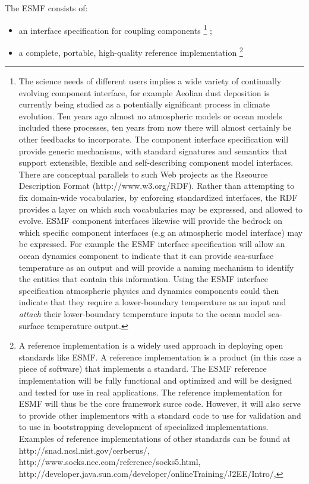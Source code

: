 \noindent The ESMF consists of:
\begin{itemize}
\item an interface specification for coupling components \footnote{
The science needs of different users
implies a wide variety of continually evolving component interface, for
example Aeolian dust deposition is currently being studied as a
potentially significant process in climate evolution. Ten years ago
almost no atmospheric models or ocean models included these processes,
ten years from now there will almost certainly be other feedbacks to
incorporate. The component interface specification will provide generic
mechanisms, with standard signatures and semantics that support
extensible, flexible and self-describing component model interfaces.
There are conceptual parallels to such Web projects as the
Rseource Description Format (http://www.w3.org/RDF). Rather than
attempting to fix domain-wide vocabularies, by enforcing standardized
interfaces, the RDF provides a layer on which
such vocabularies may be expressed, and allowed to evolve. ESMF
component interfaces likewise will provide the bedrock on which specific
component interfaces (e.g an atmospheric model interface) may be expressed.
For example the ESMF interface specification will allow an ocean dynamics component
to indicate that it can provide sea-surface temperature as an output
and will provide a naming mechanism to identify the entities that contain this information. 
Using the ESMF interface specification atmospheric physics and dynamics components 
could then indicate that they require a lower-boundary temperature as an input and 
{\it attach} their lower-boundary temperature inputs to the ocean model sea-surface 
temperature output.
}
; 
\item a complete, portable, high-quality reference implementation
\footnote{
A reference implementation is a widely used approach in deploying open
standards like ESMF. A reference implementation is a product (in this
case a piece of software) that implements a standard. The ESMF reference 
implementation will be fully functional and optimized and will be designed and
tested for use in real applications. The reference implementation for ESMF
will thus be the core framework surce code.
However, it will also serve to
provide other implementors with a standard code to use for validation 
and to use in bootstrapping development of specialized implementations.
Examples of reference implementations of other standards can be found
at http://snad.ncsl.nist.gov/cerberus/,
http://www.socks.nec.com/reference/socks5.html, http://developer.java.sun.com/developer/onlineTraining/J2EE/Intro/,
}
\end{itemize}
